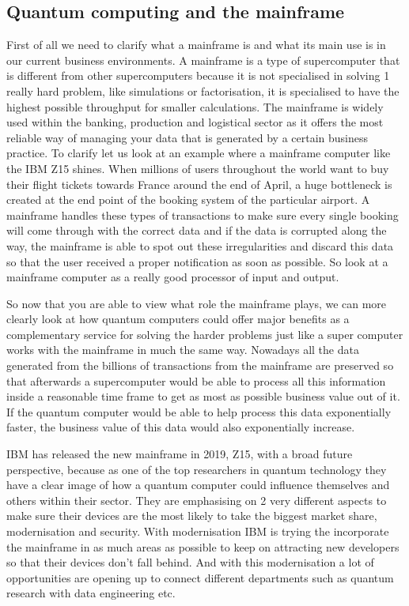 \subsection{Quantum computing and the mainframe}

First of all we need to clarify what a mainframe is and what its main use is in our current business environments. A mainframe is a type of supercomputer that is different from other supercomputers because it is not specialised in solving 1 really hard problem, like simulations or factorisation, it is specialised to have the highest possible throughput for smaller calculations. The mainframe is widely used within the banking, production and logistical sector as it offers the most reliable way of managing your data that is generated by a certain business practice. To clarify let us look at an example where a mainframe computer like the IBM Z15 shines. When millions of users throughout the world want to buy their flight tickets towards France around the end of April, a huge bottleneck is created at the end point of the booking system of the particular airport. A mainframe handles these types of transactions to make sure every single booking will come through with the correct data and if the data is corrupted along the way, the mainframe is able to spot out these irregularities and discard this data so that the user received a proper notification as soon as possible. So look at a mainframe computer as a really good processor of input and output.

So now that you are able to view what role the mainframe plays, we can more clearly look at how quantum computers could offer major benefits as a complementary service for solving the harder problems just like a super computer works with the mainframe in much the same way. Nowadays all the data generated from the billions of transactions from the mainframe are preserved so that afterwards a supercomputer would be able to process all this information inside a reasonable time frame to get as most as possible business value out of it. If the quantum computer would be able to help process this data exponentially faster, the business value of this data would also exponentially increase.



IBM has released the new mainframe in 2019, Z15, with a broad future perspective, because as one of the top researchers in quantum technology they have a clear image of how a quantum computer could influence themselves and others within their sector.
They are emphasising on 2 very different aspects to make sure their devices are the most likely to take the biggest market share, modernisation and security. 
With modernisation IBM is trying the incorporate the mainframe in as much areas as possible to keep on attracting new developers so that their devices don't fall behind. And with this modernisation a lot of opportunities are opening up to connect different departments such as quantum research with data engineering etc. 


